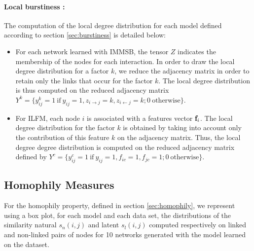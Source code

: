 \paragraph{Local burstiness : }
The computation of the local degree distribution for each model defined according to section \ref{sec:burstiness} is detailed below: 
\begin{itemize}
    \item For each network learned with IMMSB, the tensor $Z$ indicates the membership of the nodes for each  interaction. In order to draw the local degree distribution for a factor $k$, we reduce the adjacency matrix in order to retain only the links that occur for the factor $k$. The local degree distribution is thus computed on the reduced adjacency matrix  $Y^k =\{ y_{ij}^k=1 \ \textrm{if}\ y_{ij}=1 , z_{i\rightarrow j}=k, z_{i\leftarrow j}=k; 0 \ \textrm{otherwise} \}$.
        \item For ILFM, each node $i$ is associated with a features vector $\mathbf{f}_{i}$. The local degree distribution for the factor $k$ is obtained by taking into account only the contribution of this feature $k$ on the adjacency matrix. Thus, the local degree degree distribution is computed on the reduced adjacency matrix defined by $Y^c =\{ y_{ij}^c=1 \ \textrm{if}\ y_{ij}=1 , f_{ic}=1, f_{jc}=1; 0 \ \textrm{otherwise}\}$.
\end{itemize}

\subsection{Homophily Measures}


For the homophily property, defined in section \ref{sec:homophily}, we represent using a box plot, for each model and each data set, the distributions of the similarity natural $s_n(i,j)$ and latent $s_l(i,j)$ computed respectively on linked and non-linked pairs of nodes for 10 networks generated with the model learned on the dataset.


